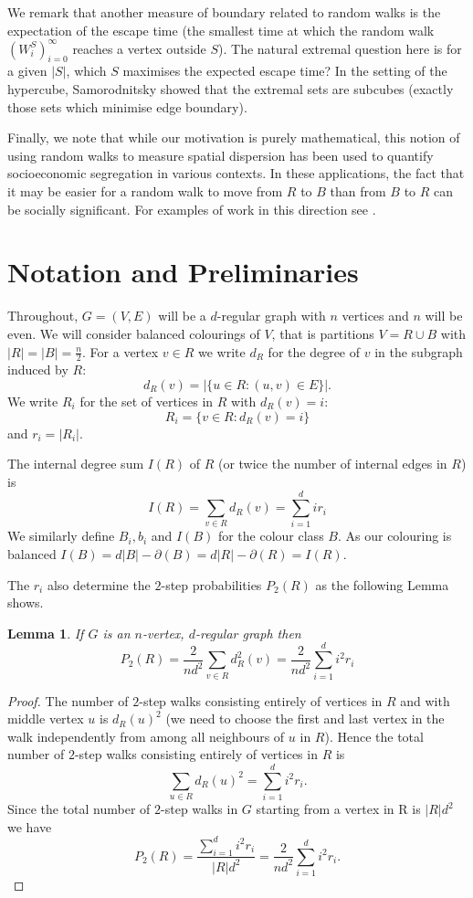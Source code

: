 \documentclass[12pt,a4paper]{article}
\newtheorem{lemma}[thm]{Lemma}
\begin{document}
We remark that another measure of boundary related to random walks is the expectation of the escape time (the smallest time at which the random walk $(W^S_i)_{i=0}^{\infty}$ reaches a vertex outside $S$). The natural extremal question here is for a given $|S|$, which $S$ maximises the expected escape time? In the setting of the hypercube, Samorodnitsky \cite{samorodnitsky} showed that the extremal sets are subcubes (exactly those sets which minimise edge boundary).

Finally, we note that while our motivation is purely mathematical, this notion of using random walks to measure spatial dispersion has been used to quantify socioeconomic segregation in various contexts. In these applications, the fact that it may be easier for a random walk to move from $R$ to $B$ than from $B$ to $R$ can be socially significant. For examples of work in this direction see \cite{BV,enzo2,enzo1}.

\section{Notation and Preliminaries}

Throughout, $G=(V,E)$ will be a $d$-regular graph with $n$ vertices and $n$ will be even. We will consider balanced colourings of $V$, that is partitions $V=R\cup B$ with $|R|=|B|=\frac{n}{2}$. For a vertex $v\in R$ we write $d_R$ for the degree of $v$ in the subgraph induced by $R$:
\[
d_R(v)=|\{u\in R : (u,v)\in E\}|.
\]
We write $R_i$ for the set of vertices in $R$ with $d_R(v)=i$:
\[
R_i=\{v\in R : d_R(v)=i\}
\]
and $r_i=|R_i|$.

The internal degree sum $I(R)$ of $R$ (or twice the number of internal edges in $R$) is
\[
I(R)=\sum_{v\in R} d_R(v)=\sum_{i=1}^d ir_i
\]
We similarly define $B_i, b_i$ and $I(B)$ for the colour class $B$. As our colouring is balanced $I(B)=d|B|-\partial(B)=d|R|-\partial(R)=I(R)$.

The $r_i$ also determine the $2$-step probabilities $P_2(R)$ as the following Lemma shows.

\begin{lemma}\label{squares}
If $G$ is an $n$-vertex, $d$-regular graph then
\[
P_2(R)=\frac{2}{nd^2}\sum_{v\in R} d^2_R(v)=\frac{2}{nd^2}\sum_{i=1}^d i^2r_i
\]
\end{lemma}

\begin{proof}
The number of $2$-step walks consisting entirely of vertices in $R$ and with middle vertex $u$ is $d_R(u)^2$ (we need to choose the first and last vertex in the walk independently from among all neighbours of $u$ in $R$). Hence the total number of $2$-step walks consisting entirely of vertices in $R$ is
\[
\sum_{u\in R} d_R(u)^2=\sum_{i=1}^d i^2r_i.
\]
Since the total number of $2$-step walks in $G$ starting from a vertex in R is $|R|d^2$ we have
\[
P_2(R)=\frac{\sum_{i=1}^d i^2r_i}{|R|d^2}=\frac{2}{nd^2}\sum_{i=1}^d i^2r_i.
\]
\end{proof}
\end{document}
